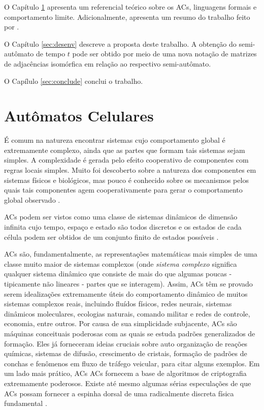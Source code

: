 \documentclass[12pt,a4paper]{article}
\begin{document}
O Capítulo \ref{sec:refteo} apresenta um referencial teórico sobre 
os ACs, linguagens formais e comportamento limite.
Adicionalmente, apresenta um resumo do trabalho feito por
.

O Capítulo \ref{sec:desenv} descreve a proposta deste trabalho. A obtenção do
semi-autômato de tempo $t$ pode ser obtido por meio de uma nova notação de 
matrizes de adjacências isomórfica em relação ao respectivo semi-autômato.

O Capílulo \ref{sec:conclude} conclui o trabalho.

\newpage

\section{Autômatos Celulares}\label{sec:refteo}

É comum na natureza encontrar sistemas cujo comportamento global é extremamente
complexo, ainda que as partes que formam tais sistemas sejam simples. A
complexidade é gerada pelo efeito cooperativo de componentes com regras locais
simples. Muito foi descoberto sobre a natureza dos componentes em sistemas físicos
e biológicos, mas pouco é conhecido sobre os mecanismos pelos quais tais componentes
agem cooperativamente para gerar o comportamento global observado .

ACs podem ser vistos como uma classe de sistemas dinâmicos de dimensão
infinita cujo tempo, espaço e estado são todos discretos e os estados de cada célula
podem ser obtidos de um conjunto finito de estados possíveis . 

ACs são, fundamentalmente, as representações matemáticas mais simples
de uma classe muito maior de sistemas complexos (onde \textit{sistema complexo} significa
qualquer sistema dinâmico que consiste de mais do que algumas poucas - tipicamente
não lineares - partes que se interagem). Assim, ACs têm se provado
serem idealizações extremamente úteis do comportamento dinâmico de muitos sistemas
complexos reais, incluindo fluídos físicos, redes neurais, sistemas dinâmicos
moleculares, ecologias naturais, comando militar e redes de controle, economia, entre
outros. Por causa de sua simplicidade subjacente, ACs são máquinas
conceituais poderosas com as quais se estuda padrões generalizados de formação. Eles
já forneceram ideias cruciais sobre auto organização de reações químicas, sistemas de
difusão, crescimento de cristais, formação de padrões de conchas e fenômenos em fluxo
de tráfego veicular, para citar alguns exemplos. Em um lado mais prático, ACs
ACs fornecem a base de algoritmos de criptografia extremamente poderosos. Existe
até mesmo algumas sérias especulações de que ACs possam fornecer
a espinha dorsal de uma radicalmente discreta física fundamental .
\end{document}

